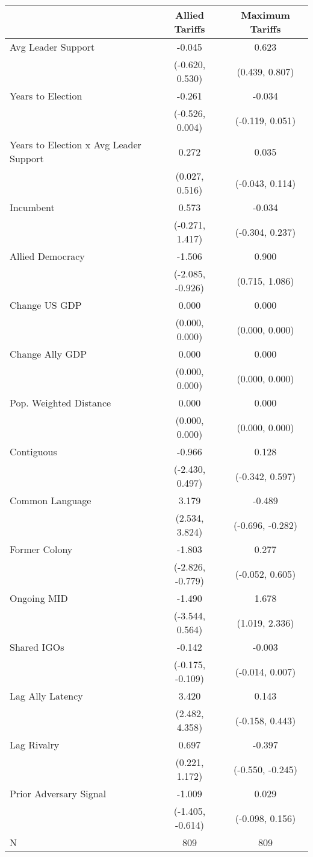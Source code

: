 
\begin{tabular}[t]{lcc}
\toprule
  & Allied Tariffs & Maximum Tariffs\\
\midrule
Avg Leader Support & -0.045 & 0.623\\
 & (-0.620, 0.530) & (0.439, 0.807)\\
Years to Election & -0.261 & -0.034\\
 & (-0.526, 0.004) & (-0.119, 0.051)\\
Years to Election x Avg Leader Support & 0.272 & 0.035\\
 & (0.027, 0.516) & (-0.043, 0.114)\\
Incumbent & 0.573 & -0.034\\
 & (-0.271, 1.417) & (-0.304, 0.237)\\
Allied Democracy & -1.506 & 0.900\\
 & (-2.085, -0.926) & (0.715, 1.086)\\
Change US GDP & 0.000 & 0.000\\
 & (0.000, 0.000) & (0.000, \vphantom{2} 0.000)\\
Change Ally GDP & 0.000 & 0.000\\
 & (0.000, 0.000) & (0.000, \vphantom{1} 0.000)\\
Pop. Weighted Distance & 0.000 & 0.000\\
 & (0.000, 0.000) & (0.000, 0.000)\\
Contiguous & -0.966 & 0.128\\
 & (-2.430, 0.497) & (-0.342, 0.597)\\
Common Language & 3.179 & -0.489\\
 & (2.534, 3.824) & (-0.696, -0.282)\\
Former Colony & -1.803 & 0.277\\
 & (-2.826, -0.779) & (-0.052, 0.605)\\
Ongoing MID & -1.490 & 1.678\\
 & (-3.544, 0.564) & (1.019, 2.336)\\
Shared IGOs & -0.142 & -0.003\\
 & (-0.175, -0.109) & (-0.014, 0.007)\\
Lag Ally Latency & 3.420 & 0.143\\
 & (2.482, 4.358) & (-0.158, 0.443)\\
Lag Rivalry & 0.697 & -0.397\\
 & (0.221, 1.172) & (-0.550, -0.245)\\
Prior Adversary Signal & -1.009 & 0.029\\
 & (-1.405, -0.614) & (-0.098, 0.156)\\
\midrule
N & 809 & 809\\
\bottomrule
\end{tabular}

